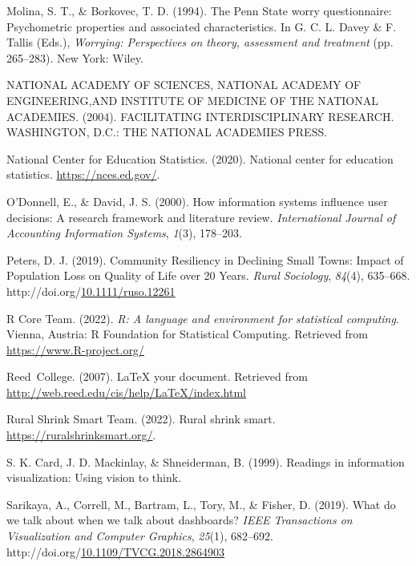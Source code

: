 \documentclass[print]{nuthesis}
\newlength{\cslhangindent}
\newenvironment{CSLReferences}[2]%
{\setlength{\parindent}{0pt}%
\everypar{\setlength{\hangindent}{\cslhangindent}}\ignorespaces}%
{\par}
\begin{document}
\begin{CSLReferences}{1}{0}
\leavevmode\hypertarget{ref-Molina1994}{}%
Molina, S. T., \& Borkovec, T. D. (1994). The {P}enn {S}tate worry questionnaire: Psychometric properties and associated characteristics. In G. C. L. Davey \& F. Tallis (Eds.), \emph{Worrying: Perspectives on theory, assessment and treatment} (pp. 265--283). New York: Wiley.

\leavevmode\hypertarget{ref-NATIONALACADEMYOFSCIENCES}{}%
NATIONAL ACADEMY OF SCIENCES, NATIONAL ACADEMY OF ENGINEERING,AND INSTITUTE OF MEDICINE OF THE NATIONAL ACADEMIES. (2004). FACILITATING INTERDISCIPLINARY RESEARCH. WASHINGTON, D.C.: THE NATIONAL ACADEMIES PRESS.

\leavevmode\hypertarget{ref-elsi}{}%
National Center for Education Statistics. (2020). National center for education statistics. \url{https://nces.ed.gov/}.

\leavevmode\hypertarget{ref-odonnell2000}{}%
O'Donnell, E., \& David, J. S. (2000). How information systems influence user decisions: A research framework and literature review. \emph{International Journal of Accounting Information Systems}, \emph{1}(3), 178--203.

\leavevmode\hypertarget{ref-petersCommunityResiliencyDeclining2019}{}%
Peters, D. J. (2019). Community {Resiliency} in {Declining} {Small} {Towns}: {Impact} of {Population} {Loss} on {Quality} of {Life} over 20 {Years}. \emph{Rural Sociology}, \emph{84}(4), 635--668. http://doi.org/\href{https://doi.org/10.1111/ruso.12261}{10.1111/ruso.12261}

\leavevmode\hypertarget{ref-r}{}%
R Core Team. (2022). \emph{R: A language and environment for statistical computing}. Vienna, Austria: R Foundation for Statistical Computing. Retrieved from \url{https://www.R-project.org/}

\leavevmode\hypertarget{ref-reedweb2007}{}%
Reed~College. (2007). LaTeX your document. Retrieved from \url{http://web.reed.edu/cis/help/LaTeX/index.html}

\leavevmode\hypertarget{ref-scc}{}%
Rural Shrink Smart Team. (2022). Rural shrink smart. \url{https://ruralshrinksmart.org/}.

\leavevmode\hypertarget{ref-Card}{}%
S. K. Card, J. D. Mackinlay, \& Shneiderman, B. (1999). Readings in information visualization: Using vision to think.

\leavevmode\hypertarget{ref-fisher}{}%
Sarikaya, A., Correll, M., Bartram, L., Tory, M., \& Fisher, D. (2019). What do we talk about when we talk about dashboards? \emph{IEEE Transactions on Visualization and Computer Graphics}, \emph{25}(1), 682--692. http://doi.org/\href{https://doi.org/10.1109/TVCG.2018.2864903}{10.1109/TVCG.2018.2864903}


\end{CSLReferences}
\end{document}
